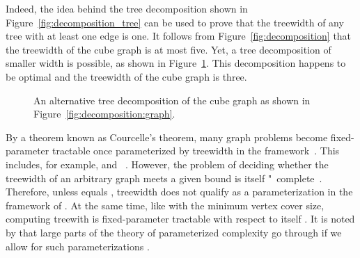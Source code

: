 Indeed, the idea behind the tree decomposition shown in Figure~\ref{fig:decomposition_tree} can be used to prove that the treewidth of any tree with at least one edge is one.
It follows from Figure~\ref{fig:decomposition} that the treewidth of the cube graph is at most five.
Yet, a tree decomposition of smaller width is possible, as shown in Figure~\ref{fig:decomposition_cube}.
This decomposition happens to be optimal and the treewidth of the cube graph is three.

\begin{figure}
  \centering
  \caption{
    An alternative tree decomposition of the cube graph as shown in Figure~\ref{fig:decomposition:graph}.
  }
  \label{fig:decomposition_cube}
\end{figure}

By a theorem known as Courcelle's theorem, many graph problems become fixed-parameter tractable once parameterized by treewidth in the \citeauthor{downey1999parameterized} framework~\parencite{downey1999parameterized}.
This includes, for example,  and ~\parencite{bodlaender2008combinatorial}.
However, the problem of deciding whether the treewidth of an arbitrary graph meets a given bound is itself "~complete~\parencite{arnborg1987complexity}.
Therefore, unless  equals , treewidth does not qualify as a parameterization in the framework of \citeauthor{flum2006parameterized}.
At the same time, like with the minimum vertex cover size, computing treewith is fixed-parameter tractable with respect to itself \parencite[stated in terms of \enquote{branch-width}]{robertson1995graph}.
It is noted by \citeauthor{flum2006parameterized} that large parts of the theory of parameterized complexity go through if we allow for such parameterizations \parencite[279]{flum2006parameterized}.

